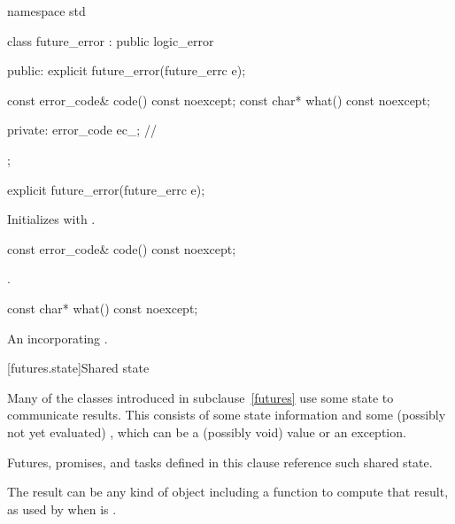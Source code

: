 %
\begin{codeblock}
namespace std {
  class future_error : public logic_error {
  public:
    explicit future_error(future_errc e);

    const error_code& code() const noexcept;
    const char*       what() const noexcept;

  private:
    error_code ec_;             // \expos
  };
}
\end{codeblock}

%
\begin{itemdecl}
explicit future_error(future_errc e);
\end{itemdecl}

\begin{itemdescr}
\pnum
\effects
Initializes  with .
\end{itemdescr}

%
\begin{itemdecl}
const error_code& code() const noexcept;
\end{itemdecl}

\begin{itemdescr}
\pnum
\returns
{}.
\end{itemdescr}

%
\begin{itemdecl}
const char* what() const noexcept;
\end{itemdecl}

\begin{itemdescr}
\pnum
\returns
An \ntbs{} incorporating .
\end{itemdescr}

[futures.state]{Shared state}

\pnum
Many of the classes introduced in subclause~\ref{futures} use some state to communicate results. This
 consists of some state information and some (possibly not
yet evaluated) , which can be a (possibly void) value or an exception.
\begin{note}
Futures, promises, and tasks defined in this clause reference such shared state.
\end{note}

\pnum
\begin{note}
The result can be any kind of object including a function to compute that result,
as used by  when  is .
\end{note}

